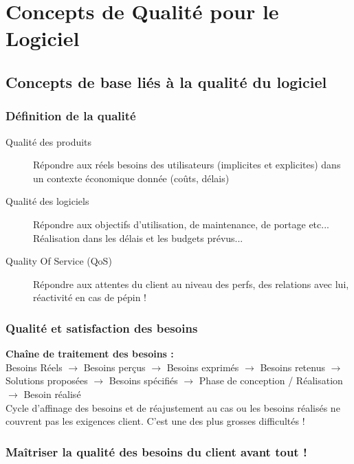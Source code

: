 \chapter{Concepts de Qualité pour le Logiciel}

\section{Concepts de base liés à la qualité du logiciel}

	\subsection{Définition de la qualité}

	\begin{description}
    \item[Qualité des produits] Répondre aux réels besoins des utilisateurs (implicites et explicites) dans un contexte économique donnée (coûts, délais)
    \item[Qualité des logiciels] Répondre aux objectifs d’utilisation, de maintenance, de portage etc... Réalisation dans les délais et les budgets prévus...
    \item[Quality Of Service (QoS)] Répondre aux attentes du client au niveau des perfs, des relations avec lui, réactivité en cas de pépin !
	\end{description}


   \subsection{Qualité et satisfaction des besoins}

\textbf{Chaîne de traitement des besoins :}\hfill\\

Besoins Réels $\rightarrow$ Besoins perçus $\rightarrow$ Besoins exprimés $\rightarrow$ Besoins retenus  $\rightarrow$  Solutions proposées $\rightarrow$ Besoins spécifiés $\rightarrow$ Phase de conception / Réalisation $\rightarrow$ Besoin réalisé\\

Cycle d’affinage des besoins et de réajustement au cas ou les besoins réalisés ne couvrent pas les exigences client. C’est une des plus grosses difficultés !\\

   \subsection{Maîtriser la qualité des besoins du client avant tout !}

